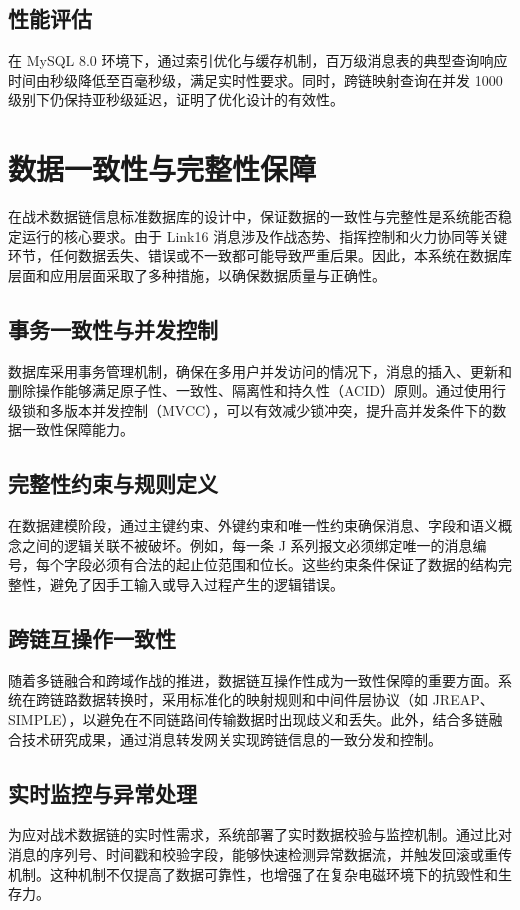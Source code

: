 \subsection{性能评估}
在 MySQL 8.0 环境下，通过索引优化与缓存机制，百万级消息表的典型查询响应时间由秒级降低至百毫秒级，满足实时性要求。同时，跨链映射查询在并发 1000 级别下仍保持亚秒级延迟，证明了优化设计的有效性。

\section{数据一致性与完整性保障}

在战术数据链信息标准数据库的设计中，保证数据的一致性与完整性是系统能否稳定运行的核心要求。由于 {Link16} 消息涉及作战态势、指挥控制和火力协同等关键环节，任何数据丢失、错误或不一致都可能导致严重后果。因此，本系统在数据库层面和应用层面采取了多种措施，以确保数据质量与正确性。

\subsection{事务一致性与并发控制}
数据库采用事务管理机制，确保在多用户并发访问的情况下，消息的插入、更新和删除操作能够满足原子性、一致性、隔离性和持久性（ACID）原则。通过使用行级锁和多版本并发控制（MVCC），可以有效减少锁冲突，提升高并发条件下的数据一致性保障能力。

\subsection{完整性约束与规则定义}
在数据建模阶段，通过主键约束、外键约束和唯一性约束确保消息、字段和语义概念之间的逻辑关联不被破坏。例如，每一条 J 系列报文必须绑定唯一的消息编号，每个字段必须有合法的起止位范围和位长。这些约束条件保证了数据的结构完整性，避免了因手工输入或导入过程产生的逻辑错误。

\subsection{跨链互操作一致性}
随着多链融合和跨域作战的推进，数据链互操作性成为一致性保障的重要方面。系统在跨链路数据转换时，采用标准化的映射规则和中间件层协议（如 JREAP、SIMPLE），以避免在不同链路间传输数据时出现歧义和丢失。此外，结合多链融合技术研究成果，通过消息转发网关实现跨链信息的一致分发和控制。

\subsection{实时监控与异常处理}
为应对战术数据链的实时性需求，系统部署了实时数据校验与监控机制。通过比对消息的序列号、时间戳和校验字段，能够快速检测异常数据流，并触发回滚或重传机制。这种机制不仅提高了数据可靠性，也增强了在复杂电磁环境下的抗毁性和生存力。

